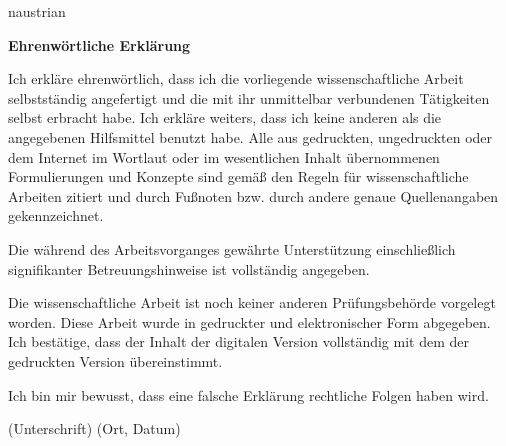 \newpage

\begin{otherlanguage*}{naustrian}

\vspace*{2.2 cm}
\Large
\noindent
{\bf Ehrenw{\"o}rtliche Erkl{\"a}rung} \\
\vspace*{0.3 cm}

\normalsize
	
	 \noindent Ich erkl{\"a}re ehrenw\"{o}rtlich, dass ich die vorliegende wissenschaftliche Arbeit 			   
	 selbstst\"{a}ndig angefertigt und die mit ihr unmittelbar verbundenen T\"{a}tigkeiten selbst erbracht 		habe. Ich erkl\"{a}re weiters, dass ich keine anderen als die angegebenen Hilfsmittel benutzt habe.
	 Alle aus gedruckten, ungedruckten oder dem Internet im Wortlaut oder im wesentlichen
	 Inhalt \"{u}bernommenen Formulierungen und Konzepte sind gem\"{a}\ss{} den Regeln f\"{u}r
	 wissenschaftliche Arbeiten zitiert und durch Fu\ss noten bzw. durch andere genaue
	 Quellenangaben gekennzeichnet. 
	 
	 Die w\"{a}hrend des Arbeitsvorganges gew\"{a}hrte Unterst\"{u}tzung einschlie\ss lich 	   
	 signifikanter Betreuungshinweise ist vollst\"{a}ndig angegeben.
	 
	 Die wissenschaftliche Arbeit ist noch keiner anderen Pr\"{u}fungsbeh\"{o}rde vorgelegt worden.
	 Diese Arbeit wurde in gedruckter und elektronischer Form abgegeben. Ich best\"{a}tige, dass
	 der Inhalt der digitalen Version vollst\"{a}ndig mit dem der gedruckten Version
	 \"{u}bereinstimmt.
	 
	 Ich bin mir bewusst, dass eine falsche Erkl\"{a}rung rechtliche Folgen haben wird.
	
	\vspace{50mm}
		
	
	 \noindent (Unterschrift) \hfill \hfill	(Ort, Datum) 

\end{otherlanguage*}